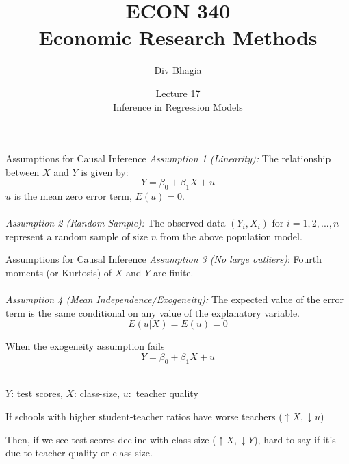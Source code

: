 \documentclass{./../div_teaching_slides}
\begin{document}
\title{ECON 340 \\ Economic Research Methods}
\author{Div Bhagia}
\date{Lecture 17 \\ Inference in Regression Models}

\begin{frame}
\maketitle
\end{frame}


\begin{frame}{Assumptions for Causal Inference}
\textit{Assumption 1 (Linearity):}
The relationship between $X$ and $Y$ is given by: 
$$ Y = \beta_0 + \beta_1 X + u $$
\vspace{1em}
$u$ is the mean zero error term, $E(u)=0$. \\~\\
\textit{Assumption 2 (Random Sample):} The observed data $(Y_i, X_i)$ for $i=1,2,...,n$ represent a random sample of size $n$ from the above population model. 
\end{frame}

\begin{frame}{Assumptions for Causal Inference}
\vspace{0.5cm}
\textit{Assumption 3 (No large outliers)}: Fourth moments (or Kurtosis) of $X$ and $Y$ are finite. \\~\\
\textit{Assumption 4 (\textit{Mean Independence}/Exogeneity):} The expected value of the error term is the same conditional on any value of the explanatory variable.
$$ E(u|X)=E(u)=0 $$ 
\end{frame}

\begin{frame}{When the exogeneity assumption fails}
$$ Y = \beta_0 + \beta_1 X + u $$ \\ \vspace{0.5em}
\begin{witemize}
\item $Y$: test scores, $X$: class-size, $u:$ teacher quality
 \item If schools with higher student-teacher ratios have worse teachers ($ \uparrow X, \downarrow u$)
 \item Then, if we see test scores decline with class size ($ \uparrow X, \downarrow Y$), hard to say if it's due to teacher quality or class size.
\end{witemize}
\end{frame}
\end{document}
